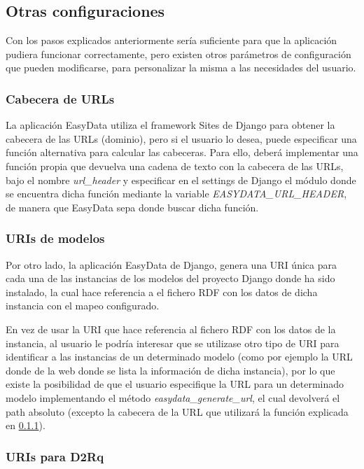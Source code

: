 \subsection{Otras configuraciones}

Con los pasos explicados anteriormente sería suficiente para que la aplicación
pudiera funcionar correctamente, pero existen otros parámetros de configuración
que pueden modificarse, para personalizar la misma a las necesidades del usuario.

\subsubsection{Cabecera de URLs}
\label{sec:cabeceraurl}

La aplicación EasyData utiliza el framework Sites de Django para obtener la
cabecera de las URLs (dominio), pero si el usuario lo desea, puede especificar
una función alternativa para calcular las cabeceras. Para ello, deberá
implementar una función propia que devuelva una cadena de texto con la cabecera
de las URLs, bajo el nombre \textit{url\_header} y especificar en el settings de
Django el módulo donde se encuentra dicha función mediante la variable
\mbox{\textit{EASYDATA\_URL\_HEADER}}, de manera que EasyData sepa donde buscar
dicha función.

\subsubsection{URIs de modelos}

Por otro lado, la aplicación EasyData de Django, genera una URI única para cada
una de las instancias de los modelos del proyecto Django donde ha sido
instalado, la cual hace referencia a el fichero RDF con los datos de dicha
instancia con el mapeo configurado.

En vez de usar la URI que hace referencia al fichero RDF con los datos de la
instancia, al usuario le podría interesar que se utilizase otro tipo de URI para
identificar a las instancias de un determinado modelo (como por ejemplo la URL
donde de la web donde se lista la información de dicha instancia), por lo que
existe la posibilidad de que el usuario especifique la URL para un determinado
modelo implementando el método \textit{easydata\_generate\_url}, el cual
devolverá el path absoluto (excepto la cabecera de la URL que utilizará la
función explicada en \ref{sec:cabeceraurl}).

\subsubsection{URIs para D2Rq}

